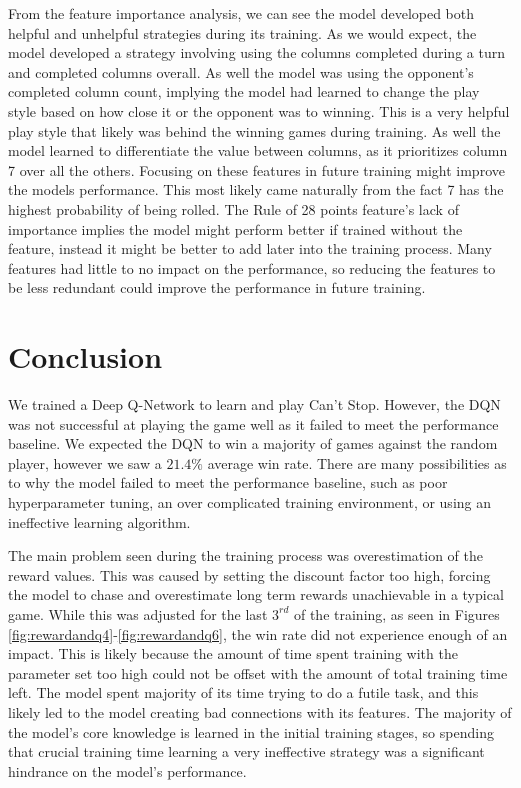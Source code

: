 \documentclass[12pt]{article}
\begin{document}
\begin{thesis}
From the feature importance analysis, we can see the model developed both helpful and unhelpful strategies during its training. As we would expect, the model developed a strategy involving using the columns completed during a turn and completed columns overall. As well the model was using the opponent's completed column count, implying the model had learned to change the play style based on how close it or the opponent was to winning. This is a very helpful play style that likely was behind the winning games during training. As well the model learned to differentiate the value between columns, as it prioritizes column 7 over all the others. Focusing on these features in future training might improve the models performance. This most likely came naturally from the fact 7 has the highest probability of being rolled. The Rule of 28 points feature's lack of importance implies the model might perform better if trained without the feature, instead it might be better to add later into the training process. Many features had little to no impact on the performance, so reducing the features to be less redundant could improve the performance in future training.

\newpage

\section{Conclusion}\label{conclusion-3}

We trained a Deep Q-Network to learn and play Can't Stop. However, the DQN was not successful at playing the game well as it failed to meet the performance baseline. We expected the DQN to win a majority of games against the random player, however we saw a \(21.4\%\) average win rate. There are many possibilities as to why the model failed to meet the performance baseline, such as poor hyperparameter tuning, an over complicated training environment, or using an ineffective learning algorithm.

The main problem seen during the training process was overestimation of the reward values. This was caused by setting the discount factor too high, forcing the model to chase and overestimate long term rewards unachievable in a typical game. While this was adjusted for the last \(3^{rd}\) of the training, as seen in Figures \ref{fig:rewardandq4}-\ref{fig:rewardandq6}, the win rate did not experience enough of an impact. This is likely because the amount of time spent training with the parameter set too high could not be offset with the amount of total training time left. The model spent majority of its time trying to do a futile task, and this likely led to the model creating bad connections with its features. The majority of the model's core knowledge is learned in the initial training stages, so spending that crucial training time learning a very ineffective strategy was a significant hindrance on the model's performance.


\end{thesis}
\end{document}
